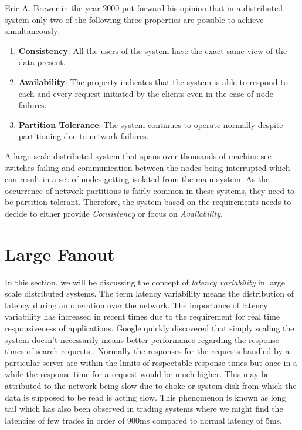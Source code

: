 \documentclass[a4paper,11pt]{kth-mag}
\begin{document}
Eric A. Brewer\cite{brewer} in the year 2000 put forward his opinion that in a distributed system only two of the following three properties are possible to achieve simultaneously:

\begin{enumerate}

\item[] \textbf{Consistency}: All the users of the system have the exact same view of the data present.
\item[] \textbf{Availability}: The property indicates that the system is able to respond to each and every request initiated by the clients even in the case of node failures. 
\item[] \textbf{Partition Tolerance}: The system continues to operate normally despite partitioning due to network failures.

\end{enumerate}

A large scale distributed system that spans over thousands of machine see switches failing and communication between the nodes being interrupted which can result in a set of nodes getting isolated from the main system. As the occurrence of network partitions is fairly common in these systems, they need to be partition tolerant. Therefore, the system based on the requirements needs to decide to either provide \textit{Consistency} or focus on \textit{Availability}.




\section{Large Fanout}

In this section, we will be discussing the concept of \textit{latency variability} in large scale distributed systems. The term latency variability means the distribution of latency during an operation over the network. The importance of latency variability has increased in recent times due to the requirement for real time responsiveness of applications. Google quickly discovered that simply scaling the system doesn't necessarily means better performance regarding the response times of search requests \cite{tamingTail}. Normally the responses for the requests handled by a particular server are within the limits of respectable response times but once in a while the response time for a request would be much higher. This may be attributed to the network being slow due to choke or system disk from which the data is supposed to be read is acting slow. This phenomenon is known as long tail which has also been observed in trading systems where we might find the latencies of few trades in order of 900ms compared to normal latency of 5ms.
\end{document}
